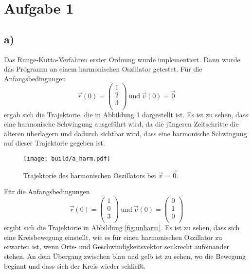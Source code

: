 \section*{Aufgabe 1}
\subsection*{a)}
Das Runge-Kutta-Verfahren erster Ordnung wurde implementiert. Dann wurde das
Programm an einem harmonischen Oszillator getestet.
Für die Anfangsbedingungen
\begin{equation*}
  \vec{r}(0) = \begin{pmatrix}
  1 \\ 2 \\ 3 \\
\end{pmatrix} \ \text{und} \
\vec{v}(0) = \vec{0}
\end{equation*}
ergab sich die Trajektorie, die in Abbildung \ref{fig:harm} dargestellt ist. Es
ist zu sehen, dass eine harmonische Schwingung ausgeführt wird, da die jüngeren
Zeitschritte die älteren überlagern und dadurch sichtbar wird, dass eine
harmonische Schwingung auf dieser Trajektorie gegeben ist.

\begin{figure}
  \centering
  \texttt{[image: build/a\_harm.pdf]}
  \caption{Trajektorie des harmonischen Oszillators bei $\vec{v} = \vec{0}$.}
  \label{fig:harm}
\end{figure}

Für die Anfangsbedingungen
\begin{equation*}
  \vec{r}(0) = \begin{pmatrix}
  1 \\ 0 \\ 3 \\
\end{pmatrix} \ \text{und} \
\vec{v}(0) = \begin{pmatrix}
  0 \\ 1 \\ 0 \\
\end{pmatrix}
\end{equation*}
ergibt sich die Trajektorie in Abbildung \ref{fig:unharm}. Es ist zu sehen, dass
sich eine Kreisbewegung einstellt, wie es für einen harmonischen Oszillator
zu erwarten ist, wenn Orts- und Geschwindigkeitsvektor senkrecht aufeinander stehen.
An dem Übergang zwischen blau und gelb ist zu sehen, wo die Bewegung beginnt
und dass sich der Kreis wieder schließt.

